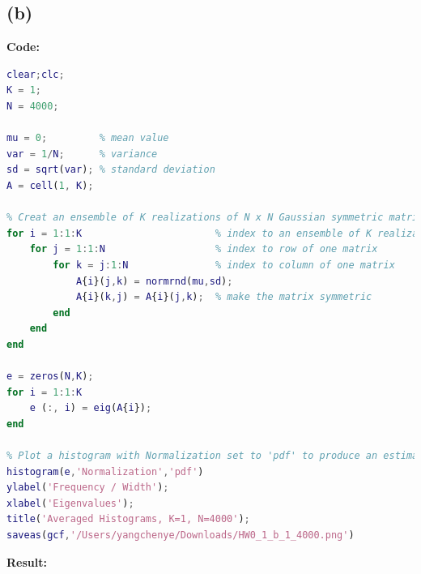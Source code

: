 \documentclass[twoside]{homework}
\begin{document}
\subsection*{(b)}
\textbf{Code:}
\begin{lstlisting}[language={Matlab}]
clear;clc;
K = 1;
N = 4000;

mu = 0;         % mean value
var = 1/N;      % variance
sd = sqrt(var); % standard deviation 
A = cell(1, K);

% Creat an ensemble of K realizations of N x N Gaussian symmetric matrices
for i = 1:1:K                       % index to an ensemble of K realizations
    for j = 1:1:N                   % index to row of one matrix
        for k = j:1:N               % index to column of one matrix
            A{i}(j,k) = normrnd(mu,sd);
            A{i}(k,j) = A{i}(j,k);  % make the matrix symmetric
        end
    end
end

e = zeros(N,K);
for i = 1:1:K
    e (:, i) = eig(A{i});
end

% Plot a histogram with Normalization set to 'pdf' to produce an estimation of the probability density function.
histogram(e,'Normalization','pdf')
ylabel('Frequency / Width');
xlabel('Eigenvalues');
title('Averaged Histograms, K=1, N=4000');
saveas(gcf,'/Users/yangchenye/Downloads/HW0_1_b_1_4000.png')
\end{lstlisting}
\textbf{Result:}
\end{document}
